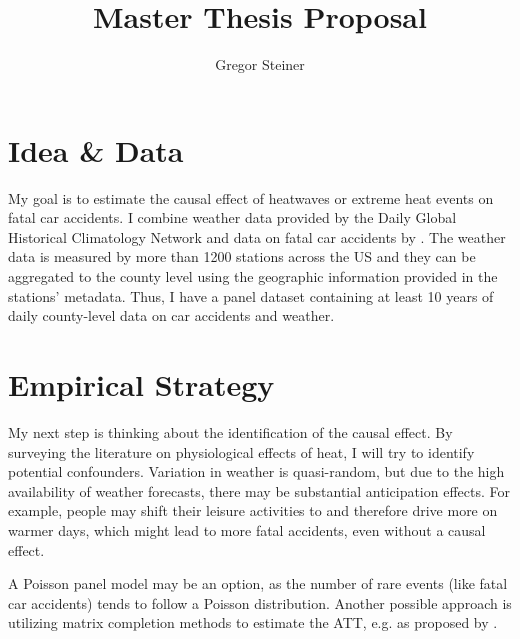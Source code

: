 \documentclass[11pt]{article}
\author{Gregor Steiner}
\title{Master Thesis Proposal}
\begin{document}
\maketitle

\section*{Idea \& Data}

My goal is to estimate the causal effect of heatwaves or extreme heat events on fatal car accidents. I combine weather data provided by the Daily Global Historical Climatology Network \citep{Menne_2012} and data on fatal car accidents by \citet{Smith_2016}. The weather data is measured by more than 1200 stations across the US and they can be aggregated to the county level using the geographic information provided in the stations' metadata. Thus, I have a panel dataset containing at least 10 years of daily county-level data on car accidents and weather.

\section*{Empirical Strategy}

My next step is thinking about the identification of the causal effect. By surveying the literature on physiological effects of heat, I will try to identify potential confounders. Variation in weather is quasi-random, but due to the high availability of weather forecasts, there may be substantial anticipation effects. For example, people may shift their leisure activities to and therefore drive more on warmer days, which might lead to more fatal accidents, even without a causal effect.

A Poisson panel model may be an option, as the number of rare events (like fatal car accidents) tends to follow a Poisson distribution. Another possible approach is utilizing matrix completion methods to estimate the ATT, e.g. as proposed by \citet{Athey_2021}.







\end{document}
